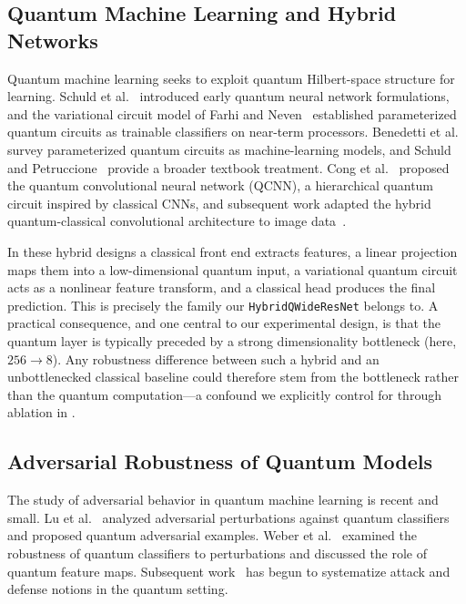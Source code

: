 \documentclass[11pt]{article}
\begin{document}
\subsection{Quantum Machine Learning and Hybrid Networks}
\label{sec:related:qml}

Quantum machine learning seeks to exploit quantum Hilbert-space structure
for learning. Schuld et al.~\cite{schuld2014quantum} introduced early
quantum neural network formulations, and the variational circuit model of
Farhi and Neven~\cite{farhi2018quantum} established parameterized quantum
circuits as trainable classifiers on near-term processors. Benedetti et
al.~\cite{benedetti2019hybrid} survey parameterized quantum circuits as
machine-learning models, and Schuld and Petruccione~\cite{schuld2019qml}
provide a broader textbook treatment. Cong et al.~\cite{cong2019qcnn}
proposed the quantum convolutional neural network (QCNN), a hierarchical
quantum circuit inspired by classical CNNs, and subsequent work adapted
the hybrid quantum-classical convolutional architecture to image
data~\cite{herrera2019qcnn_vision}.

In these hybrid designs a classical front end extracts features, a linear
projection maps them into a low-dimensional quantum input, a variational
quantum circuit acts as a nonlinear feature transform, and a classical
head produces the final prediction. This is precisely the family our
\texttt{HybridQWideResNet} belongs to. A practical consequence, and one
central to our experimental design, is that the quantum layer is typically
preceded by a strong dimensionality bottleneck (here, $256 \to 8$). Any
robustness difference between such a hybrid and an unbottlenecked classical
baseline could therefore stem from the bottleneck rather than the quantum
computation---a confound we explicitly control for through ablation in
.

\subsection{Adversarial Robustness of Quantum Models}
\label{sec:related:quantum_robust}

The study of adversarial behavior in quantum machine learning is recent
and small. Lu et al.~\cite{lu2020quantum_adv} analyzed adversarial
perturbations against quantum classifiers and proposed quantum adversarial
examples. Weber et al.~\cite{weber2020robust} examined the robustness of
quantum classifiers to perturbations and discussed the role of quantum
feature maps. Subsequent work~\cite{preset2022qmlrobust,liu2020quantum_adv_review}
has begun to systematize attack and defense notions in the quantum setting.
\end{document}
